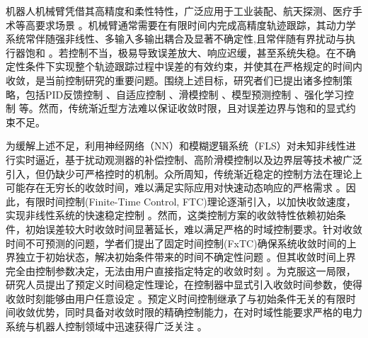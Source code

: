 \documentclass[pdflatex,sn-mathphys-num]{sn-jnl}%
\theoremstyle{thmstyleone}%
\theoremstyle{thmstyletwo}%
\theoremstyle{thmstylethree}%
\begin{document}
机器人机械臂凭借其高精度和柔性特性，广泛应用于工业装配、航天探测、医疗手术等高要求场景 \cite{SciaviccoSiciliano_2012_ModellingControl,BagheriEtAl_2019_Feedbacklinearization}。机械臂通常需要在有限时间内完成高精度轨迹跟踪，其动力学系统常伴随强非线性、多输入多输出耦合及显著不确定性,且常伴随有界扰动与执行器饱和 \cite{Spong_2022_historicalperspective, SciaviccoSiciliano_2012_ModellingControl}。若控制不当，极易导致误差放大、响应迟缓，甚至系统失稳。在不确定性条件下实现整个轨迹跟踪过程中误差的有效约束，并使其在严格规定的时间内收敛，是当前控制研究的重要问题。围绕上述目标，研究者们已提出诸多控制策略，包括PID反馈控制 \cite{ShojaeiEtAl_2021_ObserverBasedNeural,BagheriEtAl_2019_Feedbacklinearization}、自适应控制 \cite{ZhouEtAl_2022_Adaptivefinitetime,XuHe_2023_Robustadaptive,WangYang_2017_Dynamiclearning}、滑模控制 \cite{ZhangEtAl_2024_noveldisturbance,YangSu_2022_Proximatefixedtime, ZhaiLi_2022_Fastexponentialsliding}、模型预测控制 \cite{IncremonaEtAl_2017_MPCrobot}、强化学习控制 \cite{CaoEtAl_2023_ReinforcementLearningBased,WuEtAl_2024_TransferReinforcement} 等。然而，传统渐近型方法难以保证收敛时限，且对误差边界与饱和的显式约束不足。

为缓解上述不足，利用神经网络（NN）和模糊逻辑系统（FLS）对未知非线性进行实时逼近，基于扰动观测器的补偿控制、高阶滑模控制以及边界层等技术被广泛引入，但仍缺少可严格控时的机制。众所周知，传统渐近稳定的控制方法在理论上可能存在无穷长的收敛时间，难以满足实际应用对快速动态响应的严格需求 \cite{BacciottiRosier_2005_Liapunovfunctions}。因此，有限时间控制(Finite-Time Control, FTC)理论逐渐引入，以加快收敛速度，实现非线性系统的快速稳定控制 \cite{SongLi_2024_Generallyapunov,LiuEtAl_2022_overviewfinite,SongEtAl_2023_Finitetimeadaptive}。然而，这类控制方案的收敛特性依赖初始条件，初始误差较大时收敛时间显著延长，难以满足严格的时域控制要求。针对收敛时间不可预测的问题，学者们提出了固定时间控制(FxTC)确保系统收敛时间的上界独立于初始状态，解决初始条件带来的时间不确定性问题 \cite{Polyakov_2012_Nonlinearfeedback}。但其收敛时间上界完全由控制参数决定，无法由用户直接指定特定的收敛时刻 \cite{YangSu_2022_Proximatefixedtime,ZhangEtAl_2023_Globalcomposite}。为克服这一局限，研究人员提出了预定义时间稳定性理论，在控制器中显式引入收敛时间参数，使得收敛时刻能够由用户任意设定 \cite{GuoEtAl_2023_Predefinedtimestability,FanEtAl_2024_predefinedtime,WangEtAl_2022_Adaptivefuzzy}。预定义时间控制继承了与初始条件无关的有限时间收敛优势，同时具备对收敛时限的精确控制能力，在对时域性能要求严格的电力系统与机器人控制领域中迅速获得广泛关注 \cite{SunEtAl_2022_NeuralNetworkBased,WangEtAl_2022_Adaptivefuzzy,LiEtAl_2024_Adaptivepractical,ShenEtAl_2024_Predefinedtimeeventtriggered}。
\end{document}
